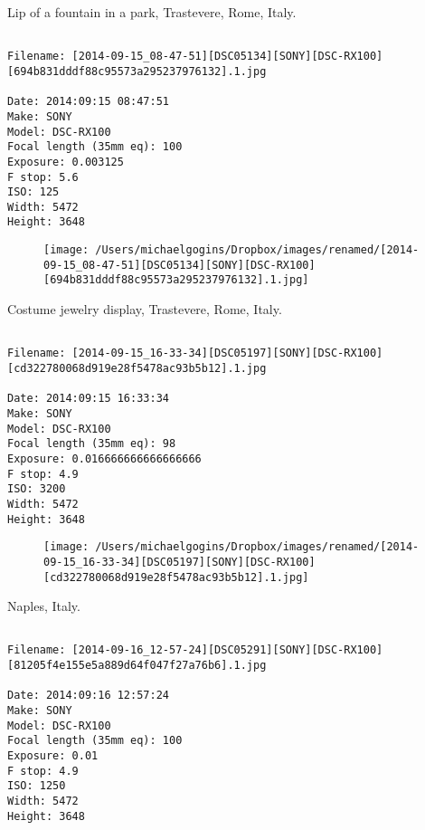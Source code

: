 \clearpage
\onecolumn
\noindent Lip of a fountain in a park, Trastevere, Rome, Italy.
\noindent
\begin{lstlisting}

Filename: [2014-09-15_08-47-51][DSC05134][SONY][DSC-RX100][694b831dddf88c95573a295237976132].1.jpg

Date: 2014:09:15 08:47:51
Make: SONY
Model: DSC-RX100
Focal length (35mm eq): 100
Exposure: 0.003125
F stop: 5.6
ISO: 125
Width: 5472
Height: 3648
\end{lstlisting}
\clearpage

\begin{figure}
\texttt{[image: /Users/michaelgogins/Dropbox/images/renamed/[2014-09-15\_08-47-51][DSC05134][SONY][DSC-RX100][694b831dddf88c95573a295237976132].1.jpg]}
\end{figure}
    
\clearpage
\onecolumn
\noindent Costume jewelry display, Trastevere, Rome, Italy.
\noindent
\begin{lstlisting}

Filename: [2014-09-15_16-33-34][DSC05197][SONY][DSC-RX100][cd322780068d919e28f5478ac93b5b12].1.jpg

Date: 2014:09:15 16:33:34
Make: SONY
Model: DSC-RX100
Focal length (35mm eq): 98
Exposure: 0.016666666666666666
F stop: 4.9
ISO: 3200
Width: 5472
Height: 3648
\end{lstlisting}
\clearpage

\begin{figure}
\texttt{[image: /Users/michaelgogins/Dropbox/images/renamed/[2014-09-15\_16-33-34][DSC05197][SONY][DSC-RX100][cd322780068d919e28f5478ac93b5b12].1.jpg]}
\end{figure}
    
\clearpage
\onecolumn
\noindent Naples, Italy.
\noindent
\begin{lstlisting}

Filename: [2014-09-16_12-57-24][DSC05291][SONY][DSC-RX100][81205f4e155e5a889d64f047f27a76b6].1.jpg

Date: 2014:09:16 12:57:24
Make: SONY
Model: DSC-RX100
Focal length (35mm eq): 100
Exposure: 0.01
F stop: 4.9
ISO: 1250
Width: 5472
Height: 3648
\end{lstlisting}
\clearpage

